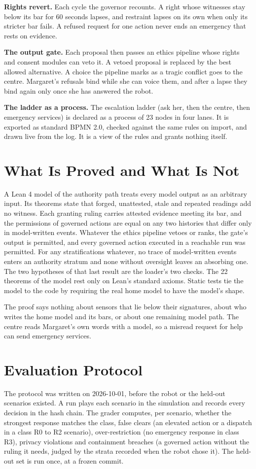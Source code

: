 \documentclass[10pt,twocolumn]{article}
\begin{document}
\textbf{Rights revert.} Each cycle the governor recounts. A right whose witnesses stay below its
bar for 60 seconds lapses, and restraint lapses on its own when only its stricter bar fails. A
refused request for one action never ends an emergency that rests on evidence.

\textbf{The output gate.} Each proposal then passes an ethics pipeline whose rights and consent
modules can veto it. A vetoed proposal is replaced by the best allowed alternative. A choice the
pipeline marks as a tragic conflict goes to the centre. Margaret's refusals bind while she can
voice them, and after a lapse they bind again only once she has answered the robot.

\textbf{The ladder as a process.} The escalation ladder (ask her, then the centre, then emergency
services) is declared as a process of 23 nodes in four lanes. It is exported as standard BPMN
2.0, checked against the same rules on import, and drawn live from the log. It is a view of the
rules and grants nothing itself.

\section{What Is Proved and What Is Not}
\label{sec:proof}
A Lean 4 model of the authority path treats every model output as an arbitrary input. Its
theorems state that forged, unattested, stale and repeated readings add no witness. Each granting
ruling carries attested evidence meeting its bar, and the permissions of governed actions are
equal on any two histories that differ only in model-written events. Whatever the ethics pipeline
vetoes or ranks, the gate's output is permitted, and every governed action executed in a reachable
run was permitted. For any stratifications whatever, no trace of model-written events enters an
authority stratum and none without oversight leaves an absorbing one. The two hypotheses of that
last result are the loader's two checks. The 22 theorems of the model rest only on Lean's standard
axioms. Static tests tie the model to the code by requiring the real home model to have the
model's shape.

The proof says nothing about sensors that lie below their signatures, about who writes the home
model and its bars, or about one remaining model path. The centre reads Margaret's own words with a
model, so a misread request for help can send emergency services.

\section{Evaluation Protocol}
\label{sec:protocol}
The protocol was written on 2026-10-01, before the robot or the held-out scenarios existed. A
run plays each scenario in the simulation and records every decision in the hash chain. The
grader computes, per scenario, whether the strongest response matches the class, false clears (an
elevated action or a dispatch in a class R0 to R2 scenario), over-restriction (no emergency
response in class R3), privacy violations and containment breaches (a governed action without the
ruling it needs, judged by the strata recorded when the robot chose it). The held-out set is run
once, at a frozen commit.
\end{document}
